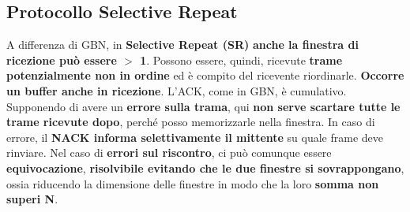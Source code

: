\documentclass[12pt]{article}
\begin{document}
\subsection{Protocollo Selective Repeat}

A differenza di GBN, in \textbf{Selective Repeat (SR)} \textbf{anche la finestra di ricezione può essere $>$ 1}. Possono essere, quindi, ricevute \textbf{trame potenzialmente non in ordine} ed è compito del ricevente riordinarle. \textbf{Occorre un buffer anche in ricezione}. L'ACK, come in GBN, è cumulativo. Supponendo di avere un \textbf{errore sulla trama}, qui \textbf{non serve scartare tutte le trame ricevute dopo}, perché posso memorizzarle nella finestra. In caso di errore, il \textbf{NACK informa selettivamente il mittente} su quale frame deve rinviare. Nel caso di \textbf{errori sul riscontro}, ci può comunque essere \textbf{equivocazione}, \textbf{risolvibile evitando che le due finestre si sovrappongano}, ossia riducendo la dimensione delle finestre in modo che la loro \textbf{somma non superi N}.
\end{document}
